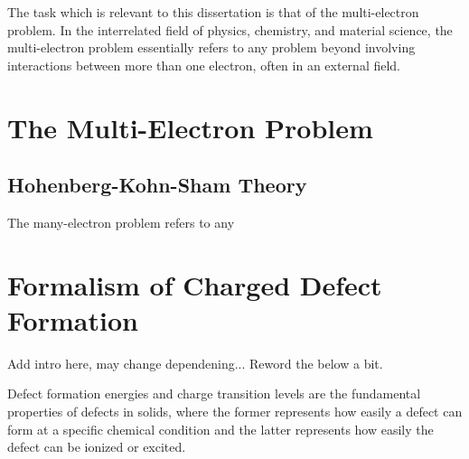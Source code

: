 The task which is relevant to this dissertation is that of the multi-electron problem. In the interrelated field of physics, chemistry, and material science,  the multi-electron problem essentially refers to any problem beyond involving interactions between more than one electron, often in an external field.


\section{The Multi-Electron Problem}

\subsection{Hohenberg-Kohn-Sham Theory}

The many-electron problem refers to any



\section{Formalism of Charged Defect Formation}

Add intro here, may change dependening... Reword the below a bit.

Defect formation energies and charge transition levels are the fundamental properties of defects in solids, where the former represents how easily a defect can form at a specific chemical condition and the latter represents how easily the defect can be ionized or excited.

